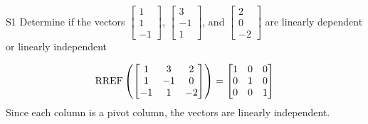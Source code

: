 \documentclass{sbgLAquiz}
\begin{document}
\begin{problem}{S1}
Determine if the vectors $\begin{bmatrix} 1 \\ 1 \\ -1 \end{bmatrix}$, $\begin{bmatrix} 3 \\ -1 \\ 1 \end{bmatrix}$, and $\begin{bmatrix} 2 \\ 0 \\ -2 \end{bmatrix}$ are linearly dependent or linearly independent
\end{problem}
\begin{solution}
$$\operatorname{RREF}\left(\begin{bmatrix} 1 & 3 & 2 \\ 1 & -1 & 0 \\ -1 & 1 & -2 \end{bmatrix} \right)= \begin{bmatrix} 1 & 0 &0 \\ 0 & 1 & 0 \\ 0 & 0 & 1\end{bmatrix}$$
Since each column is a pivot column, the vectors are linearly independent.
\end{solution}
\end{document}
